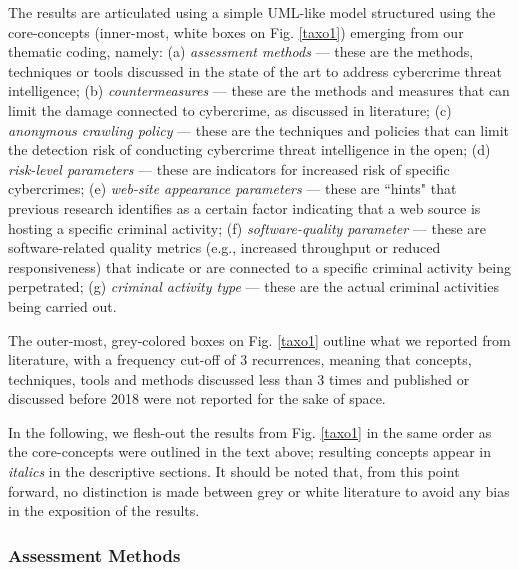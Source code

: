The results are articulated using a simple UML-like model structured using the core-concepts (inner-most, white boxes on Fig. \ref{taxo1}) emerging from our thematic coding, namely: (a) \emph{assessment methods} --- these are the methods, techniques or tools discussed in the state of the art to address cybercrime threat intelligence; (b) \emph{countermeasures} --- these are the methods and measures that can limit the damage connected to cybercrime, as discussed in literature; (c) \emph{anonymous crawling policy} --- these are the techniques and policies that can limit the detection risk of conducting cybercrime threat intelligence in the open; (d) \emph{risk-level parameters} --- these are indicators for increased risk of specific cybercrimes; (e) \emph{web-site appearance parameters} --- these are ``hints" that previous research identifies as a certain factor indicating that a web source is hosting a specific criminal activity; (f) \emph{software-quality parameter} --- these are software-related quality metrics (e.g., increased throughput or reduced responsiveness) that indicate or are connected to a specific criminal activity being perpetrated; (g) \emph{criminal activity type} --- these are the actual criminal activities being carried out.

The outer-most, grey-colored boxes on Fig. \ref{taxo1} outline what we reported from literature, with a frequency cut-off of 3 recurrences, meaning that concepts, techniques, tools and methods discussed less than 3 times and published or discussed before 2018 were not reported for the sake of space. 

In the following, we flesh-out the results from Fig. \ref{taxo1} in the same order as the core-concepts were outlined in the text above; resulting concepts appear in \emph{italics} in the descriptive sections. It should be noted that, from this point forward, no distinction is made between grey or white literature to avoid any bias in the exposition of the results.

\subsubsection{Assessment Methods}

